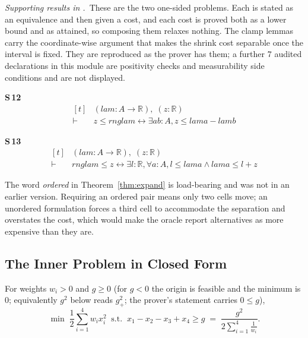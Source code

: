 
\noindent\emph{Supporting results in .}~These are the two one-sided problems. Each is stated as an equivalence and then given a cost, and each cost is proved both as a lower bound and as attained, so composing them relaxes nothing. The clamp lemmas carry the coordinate-wise argument that makes the shrink cost separable once the interval is fixed. They are reproduced as the prover has them; a further $7$ audited declarations in this module are positivity checks and measurability side conditions and are not displayed.

\noindent\textbf{S\,12}\quad{}
{\footnotesize\[ \begin{aligned}[t]
&(\mathit{lam} : \mathit{A} \to \mathbb{R} ),\; (\mathit{z} : \mathbb{R} )\\
\vdash\;&\mathit{z} \leq \mathit{rng} \mathit{lam} \leftrightarrow \exists \mathit{a} \mathit{b} : \mathit{A}, \mathit{z} \leq \mathit{lam} \mathit{a} - \mathit{lam} \mathit{b}
\end{aligned} \]}

\noindent\textbf{S\,13}\quad{}
{\footnotesize\[ \begin{aligned}[t]
&(\mathit{lam} : \mathit{A} \to \mathbb{R} ),\; (\mathit{z} : \mathbb{R} )\\
\vdash\;&\mathit{rng} \mathit{lam} \leq \mathit{z} \leftrightarrow \exists \mathit{l} : \mathbb{R} , \forall \mathit{a} : \mathit{A}, \mathit{l} \leq \mathit{lam} \mathit{a} \wedge \mathit{lam} \mathit{a} \leq \mathit{l} + \mathit{z}
\end{aligned} \]}


The word \emph{ordered} in Theorem~\ref{thm:expand} is load-bearing and was not in an earlier
version. Requiring an ordered pair means only two cells move; an unordered formulation forces
a third cell to accommodate the separation and overstates the cost, which would make the
oracle report alternatives as more expensive than they are.

\subsection{The Inner Problem in Closed Form}
\label{sec:innerqp}

\begin{theorem}
\label{thm:innerqp}
For weights $w_{i}>0$ and $g\ge 0$ (for $g<0$ the origin is feasible and the minimum is $0$; equivalently $g^{2}$ below reads $g_{+}^{2}$; the prover's statement carries $0\le g$),
\begin{equation}
\min\;\frac{1}{2}\sum_{i=1}^{4}w_{i}x_{i}^{2}
\;\;\text{s.t.}\;\;x_{1}-x_{2}-x_{3}+x_{4}\geq g
\;=\;
\frac{g^{2}}{2\sum_{i=1}^{4}\frac{1}{w_{i}}} .
\label{eq:innerqp}
\end{equation}
\end{theorem}

